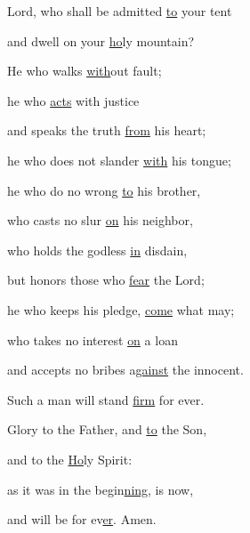 \noindent Lord, who shall be admitted \uline{to} your tent~\GreStar{}~\nopagebreak

and dwell on your \uline{ho}ly mountain?

\noindent He who walks \uline{with}out fault;~\GreStar{}~\nopagebreak

he who \uline{acts} with justice

\noindent and speaks the truth \uline{from} his heart;~\GreStar{}~\nopagebreak

he who does not slander \uline{with} his tongue;

\noindent he who do no wrong \uline{to} his brother,~\GreStar{}~\nopagebreak

who casts no slur \uline{on} his neighbor,

\noindent who holds the godless \uline{in} disdain,~\GreStar{}~\nopagebreak

but honors those who \uline{fear} the Lord;

\noindent he who keeps his pledge, \uline{come} what may;~\GreStar{}~\nopagebreak

who takes no interest \uline{on} a loan

\noindent and accepts no bribes a\uline{gainst} the innocent.~\GreStar{}~\nopagebreak

Such a man will stand \uline{firm} for ever.

\noindent Glory to the Father, and \uline{to} the Son,~\GreStar{}~\nopagebreak

and to the \uline{Ho}ly Spirit:

\noindent as it was in the begin\uline{ning}, is now,~\GreStar{}~\nopagebreak

and will be for ev\uline{er}. Amen.
